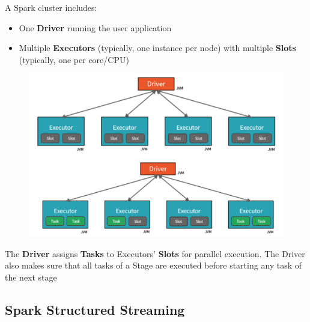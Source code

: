 \documentclass[10pt,a4paper]{article}
\begin{document}
 A Spark cluster includes:
 \begin{itemize}
 	\item One \textbf{Driver} running the user application
	\item Multiple \textbf{Executors} (typically, one instance per node) with multiple \textbf{Slots} (typically, one per core/CPU)
 \end{itemize}
  \begin{figure}[ht!]
\begin{minipage}{.5\textwidth}
  \centering
  \includegraphics[width=.8\linewidth]{images/spark-cluster}
\end{minipage}%
\begin{minipage}{.5\textwidth}
  \centering
  \includegraphics[width=.8\linewidth]{images/spark-cluster-runtime}
\end{minipage}
\end{figure}
The \textbf{Driver} assigns \textbf{Tasks} to Executors’ \textbf{Slots} for parallel execution.  The Driver also makes sure that all tasks of a Stage are executed before starting any task of the next stage
 \subsection{Spark Structured Streaming}
\end{document}
